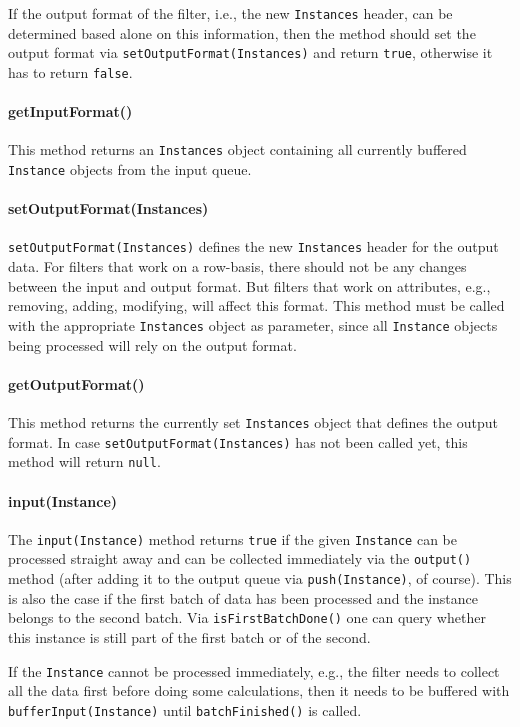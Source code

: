 If the output format of the filter, i.e., the new \texttt{Instances} header, can
be determined based alone on this information, then the method should set the
output format via \texttt{setOutputFormat(Instances)} and return \texttt{true},
otherwise it has to return \texttt{false}.

\paragraph{getInputFormat()}
This method returns an \texttt{Instances} object containing all currently
buffered \texttt{Instance} objects from the input queue.

\paragraph{setOutputFormat(Instances)}
\texttt{setOutputFormat(Instances)} defines the new \texttt{Instances} header
for the output data. For filters that work on a row-basis, there should not be
any changes between the input and output format. But filters that work on
attributes, e.g., removing, adding, modifying, will affect this format. This
method must be called with the appropriate \texttt{Instances} object as
parameter, since all \texttt{Instance} objects being processed will rely on the
output format.

\paragraph{getOutputFormat()}
This method returns the currently set \texttt{Instances} object that defines the
output format. In case \texttt{setOutputFormat(Instances)} has not been called
yet, this method will return \texttt{null}.

\paragraph{input(Instance)}
The \texttt{input(Instance)} method returns \texttt{true} if the given
\texttt{Instance} can be processed straight away and can be collected
immediately via the \texttt{output()} method (after adding it to the output
queue via \texttt{push(Instance)}, of course). This is also the case if the
first batch of data has been processed and the instance belongs to the second
batch. Via \texttt{isFirstBatchDone()} one can query whether this instance is
still part of the first batch or of the second.

If the \texttt{Instance} cannot be processed immediately, e.g., the filter needs
to collect all the data first before doing some calculations, then it needs to
be buffered with \texttt{bufferInput(Instance)} until \texttt{batchFinished()}
is called.


